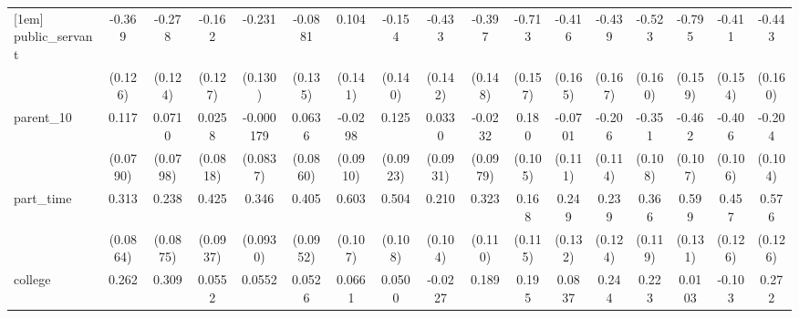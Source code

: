 {\begin{tabular}{l*{16}{c}}
[1em]
public\_servant      &      -0.369\sym{**} &      -0.278\sym{*}  &      -0.162         &      -0.231         &     -0.0881         &       0.104         &      -0.154         &      -0.433\sym{**} &      -0.397\sym{**} &      -0.713\sym{***}&      -0.416\sym{*}  &      -0.439\sym{**} &      -0.523\sym{**} &      -0.795\sym{***}&      -0.411\sym{**} &      -0.443\sym{**} \\
                    &     (0.126)         &     (0.124)         &     (0.127)         &     (0.130)         &     (0.135)         &     (0.141)         &     (0.140)         &     (0.142)         &     (0.148)         &     (0.157)         &     (0.165)         &     (0.167)         &     (0.160)         &     (0.159)         &     (0.154)         &     (0.160)         \\
[1em]
parent\_10           &       0.117         &      0.0710         &      0.0258         &   -0.000179         &      0.0636         &     -0.0298         &       0.125         &      0.0330         &     -0.0232         &       0.180         &     -0.0701         &      -0.206         &      -0.351\sym{**} &      -0.462\sym{***}&      -0.406\sym{***}&      -0.204         \\
                    &    (0.0790)         &    (0.0798)         &    (0.0818)         &    (0.0837)         &    (0.0860)         &    (0.0910)         &    (0.0923)         &    (0.0931)         &    (0.0979)         &     (0.105)         &     (0.111)         &     (0.114)         &     (0.108)         &     (0.107)         &     (0.106)         &     (0.104)         \\
[1em]
part\_time           &       0.313\sym{***}&       0.238\sym{**} &       0.425\sym{***}&       0.346\sym{***}&       0.405\sym{***}&       0.603\sym{***}&       0.504\sym{***}&       0.210\sym{*}  &       0.323\sym{**} &       0.168         &       0.249         &       0.239         &       0.366\sym{**} &       0.599\sym{***}&       0.457\sym{***}&       0.576\sym{***}\\
                    &    (0.0864)         &    (0.0875)         &    (0.0937)         &    (0.0930)         &    (0.0952)         &     (0.107)         &     (0.108)         &     (0.104)         &     (0.110)         &     (0.115)         &     (0.132)         &     (0.124)         &     (0.119)         &     (0.131)         &     (0.126)         &     (0.126)         \\
[1em]
college             &       0.262\sym{**} &       0.309\sym{**} &      0.0552         &      0.0552         &      0.0526         &      0.0661         &      0.0500         &     -0.0227         &       0.189         &       0.195         &      0.0837         &       0.244         &       0.223         &      0.0103         &      -0.103         &       0.272\sym{*}  \\

\end{tabular}}
